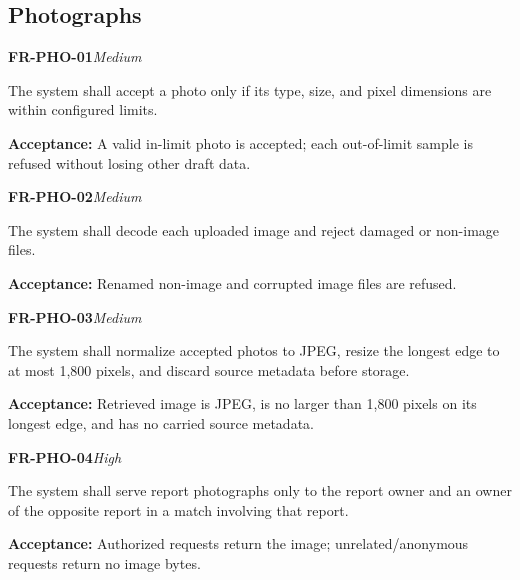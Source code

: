 \documentclass[12pt,a4paper,oneside]{report}
\begin{document}

\subsection{Photographs}

\noindent\begin{minipage}{\linewidth}\textbf{FR-PHO-01}\hfill\textit{Medium}\par\nopagebreak

The system shall accept a photo only if its type, size, and pixel dimensions are within configured limits.

{\color{muted}\textbf{Acceptance:} A valid in-limit photo is accepted; each out-of-limit sample is refused without losing other draft data.\par}\end{minipage}\par\vspace{5pt}

\noindent\begin{minipage}{\linewidth}\textbf{FR-PHO-02}\hfill\textit{Medium}\par\nopagebreak

The system shall decode each uploaded image and reject damaged or non-image files.

{\color{muted}\textbf{Acceptance:} Renamed non-image and corrupted image files are refused.\par}\end{minipage}\par\vspace{5pt}

\noindent\begin{minipage}{\linewidth}\textbf{FR-PHO-03}\hfill\textit{Medium}\par\nopagebreak

The system shall normalize accepted photos to JPEG, resize the longest edge to at most 1,800 pixels, and discard source metadata before storage.

{\color{muted}\textbf{Acceptance:} Retrieved image is JPEG, is no larger than 1,800 pixels on its longest edge, and has no carried source metadata.\par}\end{minipage}\par\vspace{5pt}

\noindent\begin{minipage}{\linewidth}\textbf{FR-PHO-04}\hfill\textit{High}\par\nopagebreak

The system shall serve report photographs only to the report owner and an owner of the opposite report in a match involving that report.

{\color{muted}\textbf{Acceptance:} Authorized requests return the image; unrelated/anonymous requests return no image bytes.\par}\end{minipage}\par\vspace{5pt}
\end{document}
